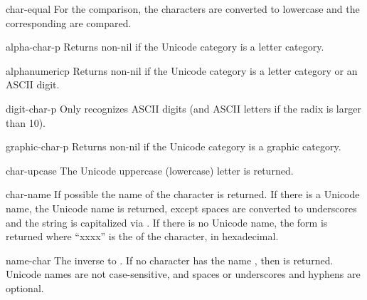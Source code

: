 \begin{defun}{}{char-equal}{\amprest{} }
   For the comparison, the characters are converted to lowercase and
   the corresponding  are compared.
\end{defun}

\begin{defun}{}{alpha-char-p}{\args {}}
  Returns non-nil{} if the Unicode category is a letter category.
\end{defun}

\begin{defun}{}{alphanumericp}{\args {}}
  Returns non-nil{} if the Unicode category is a letter category or an ASCII
  digit.
\end{defun}

\begin{defun}{}{digit-char-p}{\args {} \ampoptional{} }
   Only recognizes ASCII digits (and ASCII letters if the radix is larger
   than 10).
\end{defun}

\begin{defun}{}{graphic-char-p}{\args {}}
  Returns non-nil{} if the Unicode category is a graphic category.
\end{defun}

\begin{defun}{}{char-upcase}{\args {}}
  The Unicode uppercase (lowercase) letter is returned.
\end{defun}


\begin{defun}{}{char-name}{\args {}}
   If possible the name of the character  is returned.  If
   there is a Unicode name, the Unicode name is returned, except
   spaces are converted to underscores and the string is capitalized
   via .  If there is no Unicode name, the
   form  is returned where ``xxxx'' is the
    of the character, in hexadecimal.
\end{defun}

\begin{defun}{}{name-char}{\args {}}
  The inverse to .  If no character has the name
  , then \nil{} is returned.  Unicode names are not
  case-sensitive, and spaces or underscores and hyphens are optional.
\end{defun}
